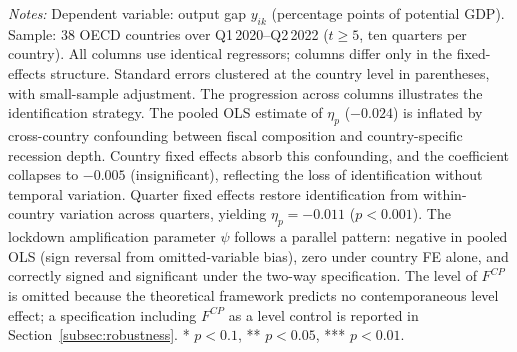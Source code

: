 \documentclass[12pt, a4paper]{article}
\begin{document}
\begin{table}[H]
\begin{tabular}{@{} l c c c @{}}
\bottomrule
\end{tabular}
\vspace{4pt}
\parbox{\textwidth}{\scriptsize\textit{Notes:} Dependent variable: output gap $y_{ik}$ (percentage points of potential GDP). Sample: 38 OECD countries over Q1\,2020--Q2\,2022 ($t \geq 5$, ten quarters per country). All columns use identical regressors; columns differ only in the fixed-effects structure. Standard errors clustered at the country level in parentheses, with small-sample adjustment. The progression across columns illustrates the identification strategy. The pooled OLS estimate of $\eta_p$ ($-0.024$) is inflated by cross-country confounding between fiscal composition and country-specific recession depth. Country fixed effects absorb this confounding, and the coefficient collapses to $-0.005$ (insignificant), reflecting the loss of identification without temporal variation. Quarter fixed effects restore identification from within-country variation across quarters, yielding $\eta_p = -0.011$ ($p < 0.001$). The lockdown amplification parameter $\psi$ follows a parallel pattern: negative in pooled OLS (sign reversal from omitted-variable bias), zero under country FE alone, and correctly signed and significant under the two-way specification. The level of $F^{CP}$ is omitted because the theoretical framework predicts no contemporaneous level effect; a specification including $F^{CP}$ as a level control is reported in Section~\ref{subsec:robustness}. * $p<0.1$, ** $p<0.05$, *** $p<0.01$.}
\end{table}
\end{document}
